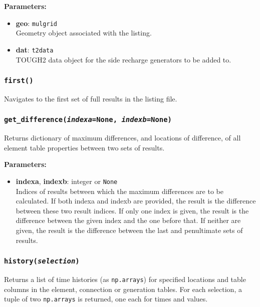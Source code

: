\textbf{Parameters:}
\begin{itemize}
\item \textbf{geo}: \texttt{mulgrid}\\
  Geometry object associated with the listing.
\item \textbf{dat}: \texttt{t2data}\\
  TOUGH2 data object for the side recharge generators to be added to.
\end{itemize}

\subsubsection{\texttt{first()}}

Navigates to the first set of full results in the listing file.

\subsubsection{\texttt{get\_difference(\emph{indexa}=None, \emph{indexb}=None)}}

Returns dictionary of maximum differences, and locations of difference, of all element table properties between two sets of results.

\textbf{Parameters:}
\begin{itemize}
\item \textbf{indexa}, \textbf{indexb}: integer or \texttt{None}\\
  Indices of results between which the maximum differences are to be calculated.  If both indexa and indexb are provided, the result is the difference between these two result indices.  If only one index is given, the result is the difference between the given index and the one before that.  If neither are given, the result is the difference between the last and penultimate sets of results.
\end{itemize}

\subsubsection{\texttt{history(\emph{selection})}}

Returns a list of time histories (as \texttt{np.arrays}) for specified locations and table columns in the element, connection or generation tables.  For each selection, a tuple of two \texttt{np.arrays} is returned, one each for times and values.

